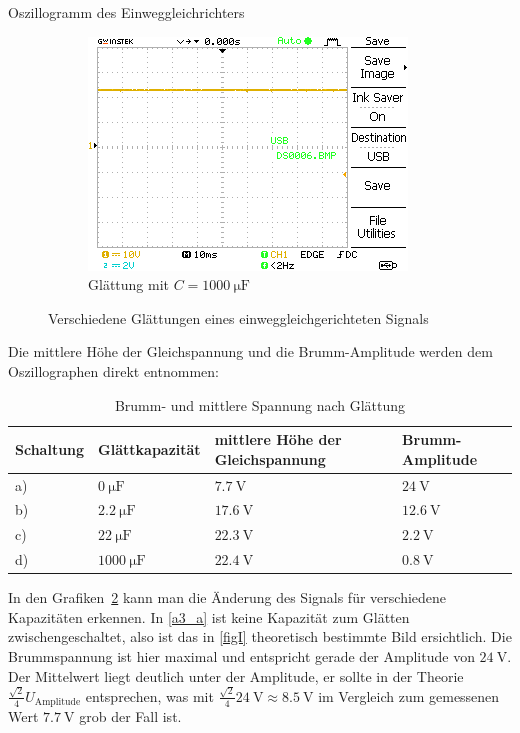 \documentclass{article}
\theoremstyle{definition}
\begin{document}
\begin{aufgabe}{Oszillogramm des Einweggleichrichters}
\begin{figure}[H]
\begin{subfigure}[b]{0.49 \textwidth}
            \includegraphics[width=\textwidth]{MesswerteVersuch2/DS0006.png}
            \caption{Glättung mit $C = \SI{1000}{\micro\farad}$}
            \label{a3_d}
        \end{subfigure}
        \caption{Verschiedene Glättungen eines einweggleichgerichteten Signals}
        \label{a3}
    \end{figure}
    Die mittlere Höhe der Gleichspannung und die Brumm-Amplitude werden dem Oszillographen direkt entnommen:
    \begin{table}[H]
        \centering
        \begin{tabular}{|l|l|l|l|}
            \hline
            Schaltung & Glättkapazität & mittlere Höhe der Gleichspannung & Brumm-Amplitude  \\
            \hline
            a) & $\SI{0}{\micro\farad}$ & $\SI{7.7}{\volt}$ & $\SI{24}{\volt}$ \\
            b) & $\SI{2.2}{\micro\farad}$ & $\SI{17.6}{\volt}$ & $\SI{12.6}{\volt}$ \\
            c) & $\SI{22}{\micro\farad}$ & $\SI{22.3}{\volt}$ & $\SI{2.2}{\volt}$ \\
            d) & $\SI{1000}{\micro\farad}$ & $\SI{22.4}{\volt}$ & $\SI{0.8}{\volt}$ \\
            \hline
        \end{tabular}
        \caption{Brumm- und mittlere Spannung nach Glättung}
    \end{table}
    \auswertung
    In den Grafiken~\ref{a3} kann man die Änderung des Signals für verschiedene Kapazitäten erkennen. In \ref{a3_a} ist keine Kapazität zum Glätten zwischengeschaltet, also ist das in \ref{figI} theoretisch bestimmte Bild ersichtlich. Die Brummspannung ist hier maximal und entspricht gerade der Amplitude von $\SI{24}{\volt}$. Der Mittelwert liegt deutlich unter der Amplitude, er sollte in der Theorie $\frac{\sqrt{2}}{4} U_\mathrm{Amplitude}$ entsprechen, was mit $\frac{\sqrt{2}}{4} \SI{24}{\volt} \approx \SI{8.5}{\volt}$ im Vergleich zum gemessenen Wert $\SI{7.7}{\volt}$ grob der Fall ist.


\end{aufgabe}
\end{document}
